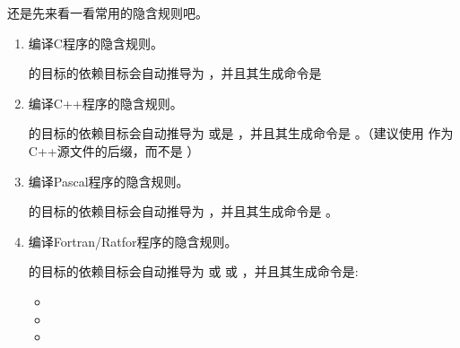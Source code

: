 \documentclass[a4paper,10pt]{sphinxmanual}
\begin{document}
还是先来看一看常用的隐含规则吧。
\begin{enumerate}
\def\theenumi{\arabic{enumi}}
\def\labelenumi{\theenumi .}
\makeatletter\def\p@enumii{\p@enumi \theenumi .}\makeatother
\item {} 
编译C程序的隐含规则。

 的目标的依赖目标会自动推导为  ，并且其生成命令是 

\item {} 
编译C++程序的隐含规则。

 的目标的依赖目标会自动推导为  或是  ，并且其生成命令是
 。（建议使用  作为C++源文件的后缀，而不是  ）

\item {} 
编译Pascal程序的隐含规则。

 的目标的依赖目标会自动推导为  ，并且其生成命令是  。

\item {} 
编译Fortran/Ratfor程序的隐含规则。

 的目标的依赖目标会自动推导为  或  或  ，并且其生成命令是:
\begin{itemize}
\item {} 
  

\item {} 
  

\item {} 
  


\end{itemize}
\end{enumerate}
\end{document}
